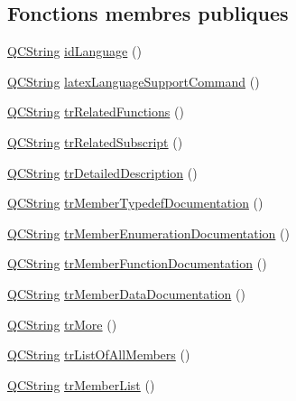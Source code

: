 \subsection*{Fonctions membres publiques}
\begin{DoxyCompactItemize}
\item 
\hyperlink{class_q_c_string}{Q\+C\+String} \hyperlink{class_translator_croatian_a7523d1409b7194459972bcdd86aeec53}{id\+Language} ()
\item 
\hyperlink{class_q_c_string}{Q\+C\+String} \hyperlink{class_translator_croatian_a1cffa3c7123adf9908782aa71d9db01a}{latex\+Language\+Support\+Command} ()
\item 
\hyperlink{class_q_c_string}{Q\+C\+String} \hyperlink{class_translator_croatian_ac41fa972eea583d5272a10427fbda600}{tr\+Related\+Functions} ()
\item 
\hyperlink{class_q_c_string}{Q\+C\+String} \hyperlink{class_translator_croatian_a2b92f76643fa9d0ddab3788451faff54}{tr\+Related\+Subscript} ()
\item 
\hyperlink{class_q_c_string}{Q\+C\+String} \hyperlink{class_translator_croatian_aab786ef813bb0d4ad68f4a27179f459b}{tr\+Detailed\+Description} ()
\item 
\hyperlink{class_q_c_string}{Q\+C\+String} \hyperlink{class_translator_croatian_a4a65b3f3158b1c165147210eeec46727}{tr\+Member\+Typedef\+Documentation} ()
\item 
\hyperlink{class_q_c_string}{Q\+C\+String} \hyperlink{class_translator_croatian_ace83dd0eb8a14d9586b491974b905059}{tr\+Member\+Enumeration\+Documentation} ()
\item 
\hyperlink{class_q_c_string}{Q\+C\+String} \hyperlink{class_translator_croatian_ad8b78086d04741b748a1af06e8ba79eb}{tr\+Member\+Function\+Documentation} ()
\item 
\hyperlink{class_q_c_string}{Q\+C\+String} \hyperlink{class_translator_croatian_ae22d44e26020fe839f0417a1b961e783}{tr\+Member\+Data\+Documentation} ()
\item 
\hyperlink{class_q_c_string}{Q\+C\+String} \hyperlink{class_translator_croatian_a70115911bfa1637d70e8c36e27c29e09}{tr\+More} ()
\item 
\hyperlink{class_q_c_string}{Q\+C\+String} \hyperlink{class_translator_croatian_a73888dc950a905e617e21975933ceb98}{tr\+List\+Of\+All\+Members} ()
\item 
\hyperlink{class_q_c_string}{Q\+C\+String} \hyperlink{class_translator_croatian_a0880dcabde46c25dbc651bfa93ef882a}{tr\+Member\+List} ()
\item 

\end{DoxyCompactItemize}
